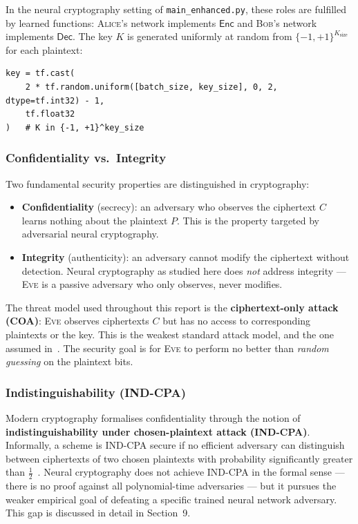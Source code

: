 \documentclass[12pt, a4paper]{article}
\newcommand{\alice}{\textsc{Alice}}
\newcommand{\bob}{\textsc{Bob}}
\newcommand{\eve}{\textsc{Eve}}
\newcommand{\code}[1]{\texttt{\color{CodeRed}#1}}
\begin{document}
In the neural cryptography setting of \code{main\_enhanced.py}, these roles
are fulfilled by learned functions: \alice{}'s network implements
$\mathsf{Enc}$ and \bob{}'s network implements $\mathsf{Dec}$. The key $K$
is generated uniformly at random from $\{-1,+1\}^{K_{\text{size}}}$ for
each plaintext:

\begin{lstlisting}[caption={Key and plaintext generation in \code{main\_enhanced.py}}]
key = tf.cast(
    2 * tf.random.uniform([batch_size, key_size], 0, 2, dtype=tf.int32) - 1,
    tf.float32
)   # K in {-1, +1}^key_size
\end{lstlisting}

\subsubsection*{Confidentiality vs.\ Integrity}

Two fundamental security properties are distinguished in cryptography:

\begin{itemize}[leftmargin=1.8em, itemsep=4pt]
  \item \textbf{Confidentiality} (secrecy): an adversary who observes the
        ciphertext $C$ learns nothing about the plaintext $P$. This is the
        property targeted by adversarial neural cryptography.
  \item \textbf{Integrity} (authenticity): an adversary cannot modify the
        ciphertext without detection. Neural cryptography as studied here
        does \emph{not} address integrity — \eve{} is a passive adversary
        who only observes, never modifies.
\end{itemize}

The threat model used throughout this report is the \textbf{ciphertext-only
attack (COA)}: \eve{} observes ciphertexts $C$ but has no access to
corresponding plaintexts or the key. This is the weakest standard attack
model, and the one assumed in~\cite{abadi2016learning}. The security
goal is for \eve{} to perform no better than \emph{random guessing} on
the plaintext bits.

\subsubsection*{Indistinguishability (IND-CPA)}

Modern cryptography formalises confidentiality through the notion of
\textbf{indistinguishability under chosen-plaintext attack (IND-CPA)}.
Informally, a scheme is IND-CPA secure if no efficient adversary can
distinguish between ciphertexts of two chosen plaintexts with probability
significantly greater than $\tfrac{1}{2}$~\cite{goldwasser1984probabilistic}.
Neural cryptography does not achieve IND-CPA in the formal sense — there
is no proof against all polynomial-time adversaries — but it pursues the
weaker empirical goal of defeating a specific trained neural network
adversary. This gap is discussed in detail in Section~9.
\end{document}
